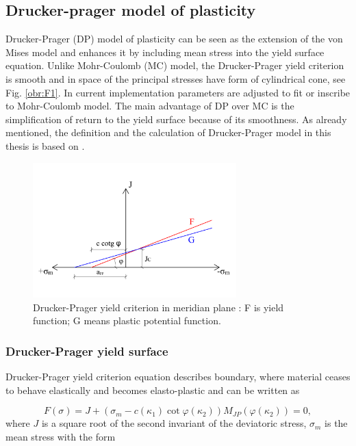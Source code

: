 \subsection{Drucker-prager model of plasticity}\label{sec:drucker-prager_introduction}
\indent

Drucker-Prager (DP) model of plasticity can be seen as the extension of the von Mises model and enhances it by including mean stress into the yield surface equation. Unlike Mohr-Coulomb (MC) model, the Drucker-Prager yield criterion is smooth and in space of the principal stresses have form of cylindrical cone, see Fig. \ref{obr:F1}. In current implementation parameters are adjusted to fit or inscribe to Mohr-Coulomb model. The main advantage of DP over MC is the simplification of return to the yield surface because of its smoothness. As already mentioned, the definition and the calculation of Drucker-Prager model in this thesis is based on \cite{geofem}.   

\begin{figure}[h!]
	\centering	
	\includegraphics[width=0.7\textwidth, angle=0]{obrazky/drucker_prager_meridian_my.png}
	\caption[Drucker-Prager yield criterion on meridian plane]{Drucker-Prager yield criterion in meridian plane \cite{geofem}: F is yield function; G means plastic potential function.} \label{obr:M1}
\end{figure}

\subsubsection{Drucker-Prager yield surface}\label{sec:drucker-prager_yield_criterion}
\indent

Drucker-Prager yield criterion equation describes boundary, where material ceases to behave elastically and becomes elasto-plastic and can be written as  

\begin{equation}\label{eq:f_yc}
	F(\sigma) = J + (\sigma_m-c(\kappa_{1}) \cot \varphi(\kappa_{2}) )M_{JP}(\varphi(\kappa_{2})) = 0,
\end{equation}
where $J$ is a square root of the second invariant of the deviatoric stress, $\sigma_m$ is the mean stress with the form 
 
